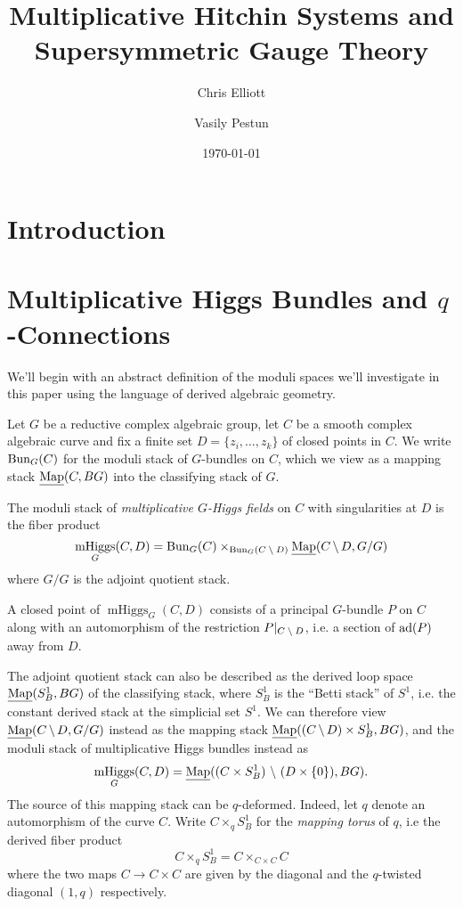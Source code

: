 \documentclass[10pt, oneside]{article}
\title{Multiplicative Hitchin Systems and Supersymmetric Gauge Theory}
\author{Chris Elliott \and Vasily Pestun}
\date{\today}
\DeclareMathOperator{\mhiggs}{mHiggs}
\newcommand{\map}{\ul{\mr{Map}}}
\renewcommand{\ad}{\mr{ad}}
\begin{document}
\maketitle 
\begin{abstract}
 
\end{abstract}

\section{Introduction}



\section{Multiplicative Higgs Bundles and $q$-Connections}
We'll begin with an abstract definition of the moduli spaces we'll investigate in this paper using the language of derived algebraic geometry.

Let $G$ be a reductive complex algebraic group, let $C$ be a smooth complex algebraic curve and fix a finite set $D = \{z_i, \ldots, z_k\}$ of closed points in $C$.  We write $\operatorname{Bun}_G(C)$ for the moduli stack of $G$-bundles on $C$, which we view as a mapping stack $\map(C, BG)$ into the classifying stack of $G$.

\begin{definition}
The moduli stack of \emph{multiplicative $G$-Higgs fields} on $C$ with singularities at $D$ is the fiber product
\[\mhiggs_G(C,D) = \bun_G(C) \times_{\bun_G(C \! \bs \! D)} \map(C \! \bs \! D, G/G)\]
where $G/G$ is the adjoint quotient stack.
\end{definition}

\begin{remark}
A closed point of $\mhiggs_G(C,D)$ consists of a principal $G$-bundle $P$ on $C$ along with an automorphism of the restriction $P|_{C \! \ \backslash \  \! D}$, i.e. a section of $\ad(P)$ away from $D$.
\end{remark}

The adjoint quotient stack can also be described as the derived loop space $\map(S^1_B, BG)$ of the classifying stack, where $S^1_B$ is the ``Betti stack'' of $S^1$, i.e. the constant derived stack at the simplicial set $S^1$.  We can therefore view $\map(C \! \bs \! D, G/G)$ instead as the mapping stack $\map((C \! \bs \! D) \times S^1_B, BG)$, and the moduli stack of multiplicative Higgs bundles instead as
\[\mhiggs_G(C,D) = \map((C \times S^1_B) \bs (D \times \{0\}), BG).\]  
The source of this mapping stack can be $q$-deformed.  Indeed, let $q$ denote an automorphism of the curve $C$.  Write $C \times_q S^1_B$ for the \emph{mapping torus} of $q$, i.e the derived fiber product
\[C \times_q S^1_B = C \times_{C \times C} C\]
where the two maps $C \to C \times C$ are given by the diagonal and the $q$-twisted diagonal $(1,q)$ respectively.
\end{document}
